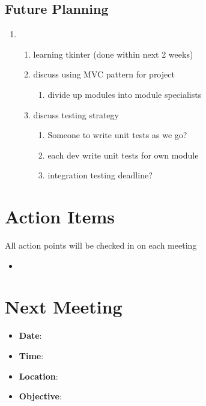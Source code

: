 \documentclass{article}
\begin{document}
\subsection*{Future Planning}
\begin{enumerate}
    \item
    \begin{enumerate}
        \item learning tkinter (done within next 2 weeks)
        \item discuss using MVC pattern for project
        \begin{enumerate}
            \item divide up modules into module specialists 
        \end{enumerate}
        \item discuss testing strategy
         \begin{enumerate}
            \item Someone to write unit tests as we go?
            \item each dev write unit tests for own module
            \item integration testing deadline?
        \end{enumerate}
    \end{enumerate}
\end{enumerate}

\section*{Action Items}
All action points will be checked in on each meeting
\begin{itemize}
    \item 
\end{itemize}


\section*{Next Meeting}

\begin{itemize}
    \item \textbf{Date}: 
    \item \textbf{Time}:
    \item \textbf{Location}:
    \item \textbf{Objective}:
\end{itemize}
\end{document}
